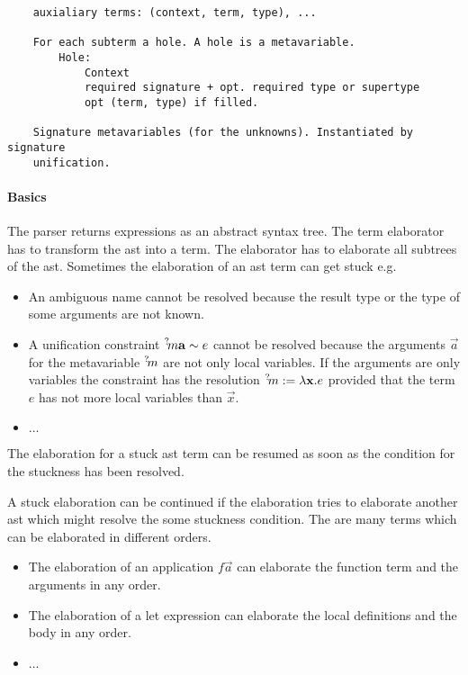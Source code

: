 \begin{verbatim}
    auxialiary terms: (context, term, type), ...

    For each subterm a hole. A hole is a metavariable.
        Hole:
            Context
            required signature + opt. required type or supertype
            opt (term, type) if filled.

    Signature metavariables (for the unknowns). Instantiated by signature
    unification.
\end{verbatim}




\paragraph{Basics}

The parser returns expressions as an abstract syntax tree. The term elaborator
has to transform the ast into a  term. The elaborator has to elaborate all
subtrees of the ast. Sometimes the elaboration of an ast term can get stuck e.g.
\begin{itemize}
    \item An ambiguous name cannot be resolved because the result type or the
        type of some arguments are not known.

    \item A unification constraint ${{}^? \kern-0.2em m} {\mathbf a} \sim e$ cannot be resolved
        because the arguments $\vec a$ for the metavariable ${{}^? \kern-0.2em m}$ are not
        only local variables. If the arguments are only variables the constraint
        has the resolution ${{}^? \kern-0.2em m} := \lambda {\mathbf x}. e$ provided that the term
        $e$ has not more local variables than $\vec x$.

    \item $\ldots$
\end{itemize}

The elaboration for a stuck ast term can be resumed as soon as the condition for
the stuckness has been resolved.

A stuck elaboration can be continued if the elaboration tries to elaborate
another ast which might resolve the some stuckness condition. The are many terms
which can be elaborated in different orders.

\begin{itemize}
    \item The elaboration of an application $f \vec a$ can elaborate the
        function term and the arguments in any order.

    \item The elaboration of a let expression can elaborate the local
        definitions and the body in any order.

    \item $\ldots$
\end{itemize}

